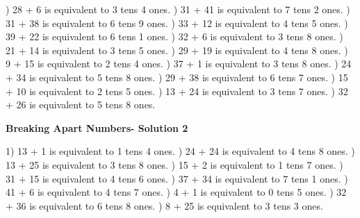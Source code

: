 \documentclass{article}%
\begin{document}
) 28 + 6 is equivalent to 3 tens 4 ones.%
) 31 + 41 is equivalent to 7 tens 2 ones.%
) 31 + 38 is equivalent to 6 tens 9 ones.%
) 33 + 12 is equivalent to 4 tens 5 ones.%
) 39 + 22 is equivalent to 6 tens 1 ones.%
) 32 + 6 is equivalent to 3 tens 8 ones.%
) 21 + 14 is equivalent to 3 tens 5 ones.%
) 29 + 19 is equivalent to 4 tens 8 ones.%
) 9 + 15 is equivalent to 2 tens 4 ones.%
) 37 + 1 is equivalent to 3 tens 8 ones.%
) 24 + 34 is equivalent to 5 tens 8 ones.%
) 29 + 38 is equivalent to 6 tens 7 ones.%
) 15 + 10 is equivalent to 2 tens 5 ones.%
) 13 + 24 is equivalent to 3 tens 7 ones.%
) 32 + 26 is equivalent to 5 tens 8 ones.%
\newline%
\newpage%
\large%
\begin{center}%
\textbf{Breaking Apart Numbers- Solution 2}%
\newline%
\end{center} \normalsize%
1) 13 + 1 is equivalent to 1 tens 4 ones.%
) 24 + 24 is equivalent to 4 tens 8 ones.%
) 13 + 25 is equivalent to 3 tens 8 ones.%
) 15 + 2 is equivalent to 1 tens 7 ones.%
) 31 + 15 is equivalent to 4 tens 6 ones.%
) 37 + 34 is equivalent to 7 tens 1 ones.%
) 41 + 6 is equivalent to 4 tens 7 ones.%
) 4 + 1 is equivalent to 0 tens 5 ones.%
) 32 + 36 is equivalent to 6 tens 8 ones.%
) 8 + 25 is equivalent to 3 tens 3 ones.%
\newline%
\end{document}
